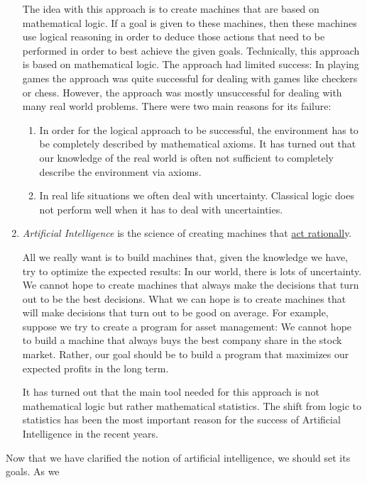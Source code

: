 \begin{enumerate}
      The idea with this approach is to create machines that are based on mathematical logic.  If a
      goal is given to these machines, then these machines use logical reasoning in order to deduce
      those actions that need to be performed in order to best achieve the given goals. Technically,
      this approach is based on mathematical logic.  The approach had limited success:  In playing
      games the approach was quite successful for dealing with games like checkers or chess.
      However, the approach was mostly unsuccessful for dealing with many real world problems.
      There were two main reasons for its failure:
      \begin{enumerate}
      \item In order for the logical approach to be successful, the environment has to be completely
            described by mathematical axioms.  It has turned out that our knowledge of the real
            world is often not sufficient to completely describe the environment via axioms.  
      \item In real life situations we often deal with uncertainty.  Classical logic does not
            perform well when it has to deal with  uncertainties.
      \end{enumerate}
\item \emph{Artificial Intelligence} is the science of creating machines that \underline{act rationall}y.

      All we really want is to build machines that, given the knowledge we have, try to optimize the
      expected results:  In our world, there is lots of uncertainty.  We cannot hope to create
      machines that always make the decisions that turn out to be the best decisions.  What we can
      hope is to create machines that will make decisions that turn out to be good on average.  For
      example, suppose we try to create a program for asset management:  We cannot hope to build a
      machine that always buys the best company share in the stock market.  Rather, our goal should
      be to build a program that maximizes our expected profits in the long term.

      It has turned out that the main tool needed for this approach is not mathematical logic but
      rather mathematical statistics.  The shift from logic to statistics has been the most
      important reason for the success of Artificial Intelligence in the recent years.
\end{enumerate}
Now that we have clarified the notion of artificial intelligence, we should set its goals.  As we

